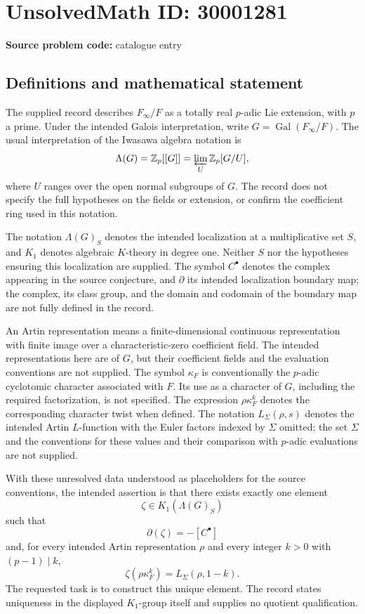\documentclass[11pt]{article}
\newcommand{\Z}{\mathbb{Z}}
\begin{document}
\section*{UnsolvedMath ID: 30001281}
\textbf{Source problem code:} catalogue entry
\subsection{Definitions and mathematical statement}
The supplied record describes \(F_\infty/F\) as a totally real \(p\)-adic Lie extension, with \(p\) a prime. Under the intended Galois interpretation, write \(G=\operatorname{Gal}(F_\infty/F)\). The usual interpretation of the Iwasawa algebra notation is
\[
\Lambda(G)=\Z_p[[G]]=\varprojlim_U\Z_p[G/U],
\]
where \(U\) ranges over the open normal subgroups of \(G\). The record does not specify the full hypotheses on the fields or extension, or confirm the coefficient ring used in this notation.

The notation \(\Lambda(G)_S\) denotes the intended localization at a multiplicative set \(S\), and \(K_1\) denotes algebraic \(K\)-theory in degree one. Neither \(S\) nor the hypotheses ensuring this localization are supplied. The symbol \(C^\bullet\) denotes the complex appearing in the source conjecture, and \(\partial\) its intended localization boundary map; the complex, its class group, and the domain and codomain of the boundary map are not fully defined in the record.

An Artin representation means a finite-dimensional continuous representation with finite image over a characteristic-zero coefficient field. The intended representations here are of \(G\), but their coefficient fields and the evaluation conventions are not supplied. The symbol \(\kappa_F\) is conventionally the \(p\)-adic cyclotomic character associated with \(F\). Its use as a character of \(G\), including the required factorization, is not specified. The expression \(\rho\kappa_F^k\) denotes the corresponding character twist when defined. The notation \(L_\Sigma(\rho,s)\) denotes the intended Artin \(L\)-function with the Euler factors indexed by \(\Sigma\) omitted; the set \(\Sigma\) and the conventions for these values and their comparison with \(p\)-adic evaluations are not supplied.

With these unresolved data understood as placeholders for the source conventions, the intended assertion is that there exists exactly one element
\[
\zeta\in K_1(\Lambda(G)_S)
\]
such that
\[
\partial(\zeta)=-[C^\bullet]
\]
and, for every intended Artin representation \(\rho\) and every integer \(k>0\) with \((p-1)\mid k\),
\[
\zeta(\rho\kappa_F^k)=L_\Sigma(\rho,1-k).
\]
The requested task is to construct this unique element. The record states uniqueness in the displayed \(K_1\)-group itself and supplies no quotient qualification.
\end{document}
